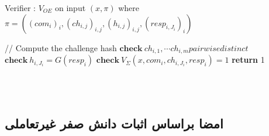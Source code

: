 \begin{algorithm}\label{alg_verifier}
	\caption{
		Verifier : $V_{OE}$ on input $(x,\pi) $
		where \newline
		\qquad $\pi =  ( (com_i)_i , (ch_{i,j})_{i,j} , (h_{i,j})_{i,j} , (resp_{i,J_i})_i  )$
	}
	\begin{latin}
	\begin{algorithmic}[1]
		\State // Compute the challenge hash
		\State $ \textbf{check} ~ ch_{i,1} , \cdots ch_{i,m} pairwise distinct $
		\State $ \textbf{check} ~ h_{i,J_i} = G(resp_i) $
		\State $ \textbf{check} ~ V_{\Sigma}(x,com_i,ch_{i,J_i} , resp_i) = 1 $
		\EndFor
		\textbf{return} 1
		\EndIf
		
	\end{algorithmic}
	\end{latin}
\end{algorithm}

\newpage~
\\
\\
\subsection{امضا براساس اثبات دانش صفر غیرتعاملی }\label{sign_from_nzkp}

